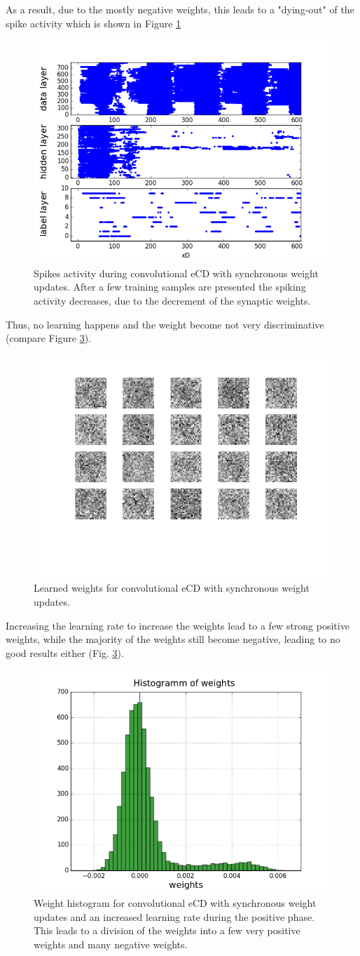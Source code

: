 As a result, due to the mostly negative weights, this leads to a "dying-out" of the spike activity which is shown in Figure \ref{fig:ecdnestdieout} 

\begin{figure}[h!]
 	\centering
  	\includegraphics[width=.4\linewidth]{imgs/app/nest/spikes_conv.png}
  	\caption[Spikes activity during convolutional eCD with synchronous weight updates.]{Spikes activity during convolutional eCD with synchronous weight updates. After a few training samples are presented the spiking activity decreases, due to the decrement of the synaptic weights.}
  	\label{fig:ecdnestdieout}
\end{figure}

Thus, no learning happens and the weight become not very discriminative (compare Figure \ref{fig:ecdnestwnot}).


\begin{figure}[h!]
 	\centering
  	\includegraphics[width=.4\linewidth]{imgs/app/nest/w_not.png}
  	\caption{Learned weights for convolutional eCD with synchronous weight updates.}
  	\label{fig:ecdnestwnot}
\end{figure}

Increasing the learning rate to increase the weights lead to a few strong positive weights, while the majority of the weights still become negative, leading to no good results either (Fig. \ref{fig:ecdnestwnot}).


\begin{figure}[h!]
 	\centering
  	\includegraphics[width=.4\linewidth]{imgs/app/nest/w_hist_conv_lr.png}
  	\caption[Weight histogram for convolutional eCD with synchronous weight updates and an increased learning rate during the positive phase.]{Weight histogram for convolutional eCD with synchronous weight updates and an increased learning rate during the positive phase. This leads to a division of the weights into a few very positive weights and many negative weights. }
  	\label{fig:ecdnestwnot}
\end{figure}

